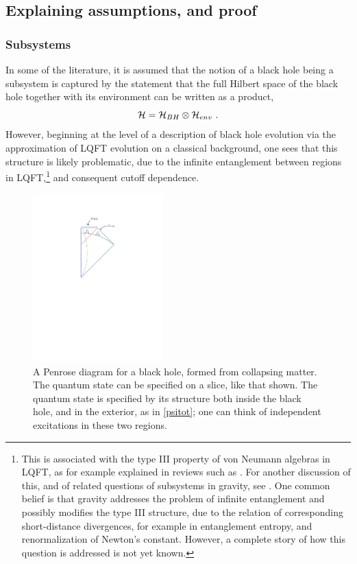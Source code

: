 \documentclass[12pt]{article}
\numberwithin{equation}{section}
\newcommand{\calh}{{\cal H}}
\newcommand{\beq}{\begin{equation}}
\newcommand{\eeq}{\end{equation}}
\begin{document}
\subsection{Explaining assumptions, and proof}

\subsubsection{Subsystems}
\label{Subs}

In some of the  literature, it is assumed that the notion of a black hole being a subsystem is captured by the statement that the full Hilbert space of the black hole together with its environment can be written as a product,
\beq\label{tensprod}
\calh = \calh_{BH}\otimes\calh_{env}\ .
\eeq
However, beginning at the level of a description of black hole evolution  via the approximation of LQFT evolution on a classical background, one sees that this structure is likely problematic, due to the infinite entanglement between regions in LQFT,\footnote{This is associated with the type III property of von Neumann algebras in LQFT, as for example explained in reviews such as \cite{Haag}.  For another discussion of this,  and of related questions of subsystems in gravity, see \cite{SGalg}.  One common belief is that gravity addresses the problem of infinite entanglement and possibly modifies the type III structure, due to the relation of corresponding short-distance divergences, for example in entanglement entropy, and renormalization of Newton's constant.  However, a complete story of how this question is addressed is not yet known.}  and consequent cutoff dependence.

\begin{figure}[!hbtp] \begin{center}
\includegraphics[width=5cm]{Fig-PenS.pdf}
\end{center}
\caption{A Penrose diagram for a black hole, formed from collapsing matter.  The quantum state can be specified on a slice, like that shown.  The quantum state is specified by its structure both inside the black hole, and in the exterior, as in \eqref{psitot}; one can think of independent excitations in these two regions.}
\label{FigPen}
\end{figure} 
\end{document}
